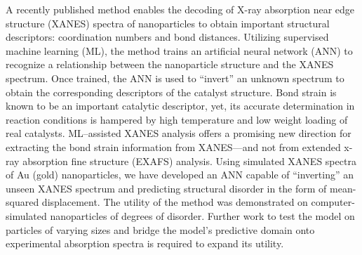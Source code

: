 


A recently published method \cite{Timoshenko2017} enables the decoding of X-ray absorption near edge structure (XANES) spectra of nanoparticles to obtain important structural descriptors: coordination numbers and bond distances. Utilizing supervised machine learning (ML), the method trains an artificial neural network (ANN) to recognize a relationship between the nanoparticle structure and the XANES spectrum. Once trained, the ANN is used to ``invert'' an unknown spectrum to obtain the corresponding descriptors of the catalyst structure. Bond strain is known to be an important catalytic descriptor, yet, its accurate determination in reaction conditions is hampered by high temperature and low weight loading of real catalysts. ML–assisted XANES analysis offers a promising new direction for extracting the bond strain information from XANES---and not from extended x-ray absorption fine structure (EXAFS) analysis. Using simulated XANES spectra of Au (gold) nanoparticles, we have developed an ANN capable of ``inverting'' an unseen XANES spectrum and predicting structural disorder in the form of mean-squared displacement. The utility of the method was demonstrated on computer-simulated nanoparticles of degrees of disorder. Further work to test the model on particles of varying sizes and bridge the model's predictive domain onto experimental absorption spectra is required to expand its utility.


